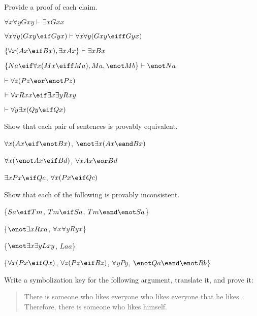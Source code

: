 \problempart
Provide a proof of each claim.
\begin{earg}
\item $\forall x \forall y Gxy\vdash\exists x Gxx$
\item $\forall x \forall y (Gxy \eif Gyx) \vdash \forall x\forall y (Gxy \eiff Gyx)$
\item $\{\forall x(Ax\eif Bx), \exists x Ax\} \vdash \exists x Bx$
\item $\{Na \eif \forall x(Mx \eiff Ma), Ma, \enot Mb\}\vdash \enot Na$
\item $\vdash\forall z (Pz \eor \enot Pz)$
\item $\vdash\forall x Rxx\eif \exists x \exists y Rxy$
\item $\vdash\forall y \exists x (Qy \eif Qx)$
\end{earg}



\problempart
Show that each pair of sentences is provably equivalent.
\begin{earg}
\item $\forall x (Ax\eif \enot Bx)$, $\enot\exists x(Ax \eand Bx)$
\item $\forall x (\enot Ax\eif Bd)$, $\forall x Ax \eor Bd$
\item $\exists x Px \eif Qc$, $\forall x (Px \eif Qc)$
\end{earg}



\problempart
Show that each of the following is provably inconsistent.
\begin{earg}
\item \{$Sa\eif Tm$, $Tm \eif Sa$, $Tm \eand \enot Sa$\}
\item \{$\enot\exists x Rxa$, $\forall x \forall y Ryx$\}
\item \{$\enot\exists x \exists y Lxy$, $Laa$\}
\item \{$\forall x(Px \eif Qx)$, $\forall z(Pz \eif Rz)$, $\forall y Py$, $\enot Qa \eand \enot Rb$\}
\end{earg}



\solutions
\problempart
\label{pr.likes}
Write a symbolization key for the following argument, translate it, and prove it:
\begin{quote}
There is someone who likes everyone who likes everyone that he likes. Therefore, there is someone who likes himself.
\end{quote}

